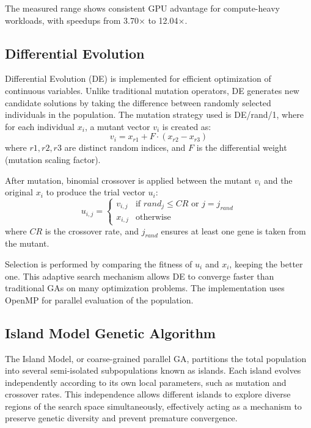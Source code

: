 \documentclass[conference]{IEEEtran}
\begin{document}
    The measured range shows consistent GPU advantage for compute-heavy workloads, with speedups from 3.70$\times$ to 12.04$\times$.


    

    \subsection{Differential Evolution}
    Differential Evolution (DE) is implemented for efficient optimization of continuous variables. Unlike traditional mutation operators, DE generates new candidate solutions by taking the difference between randomly selected individuals in the population. The mutation strategy used is DE/rand/1, where for each individual $x_i$, a mutant vector $v_i$ is created as:
    \begin{equation}
        v_i = x_{r1} + F \cdot (x_{r2} - x_{r3})
    \end{equation}
    where $r1, r2, r3$ are distinct random indices, and $F$ is the differential weight (mutation scaling factor).

    After mutation, binomial crossover is applied between the mutant $v_i$ and the original $x_i$ to produce the trial vector $u_i$:
    \begin{equation}
        u_{i,j} = \begin{cases} 
        v_{i,j} & \text{if } rand_j \leq CR \text{ or } j = j_{rand} \\
        x_{i,j} & \text{otherwise}
        \end{cases}
    \end{equation}
    where $CR$ is the crossover rate, and $j_{rand}$ ensures at least one gene is taken from the mutant.

    Selection is performed by comparing the fitness of $u_i$ and $x_i$, keeping the better one. This adaptive search mechanism allows DE to converge faster than traditional GAs on many optimization problems. The implementation uses OpenMP for parallel evaluation of the population.

    \subsection{Island Model Genetic Algorithm}
    The Island Model, or coarse-grained parallel GA, partitions the total population into several semi-isolated subpopulations known as islands. Each island evolves independently according to its own local parameters, such as mutation and crossover rates. This independence allows different islands to explore diverse regions of the search space simultaneously, effectively acting as a mechanism to preserve genetic diversity and prevent premature convergence. 
\end{document}
